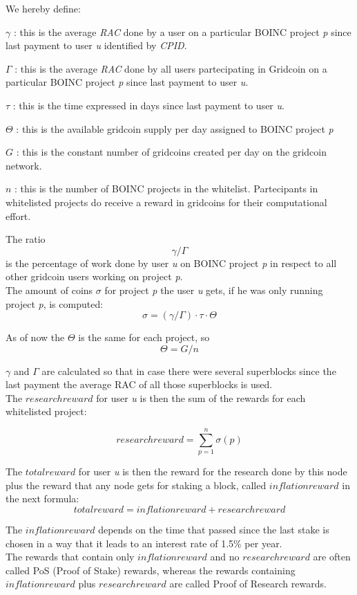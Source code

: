  

We hereby define:
\begin{description}
  \item{$\gamma$} : this is the average \textit{RAC} done by a user on a particular BOINC project \textit{p} since last payment to user \textit{u} identified by \textit{CPID}.
  \item{$\Gamma$} : this is the average \textit{RAC} done by all users partecipating in Gridcoin on a particular BOINC project \textit{p} since last payment to user \textit{u}.
  \item{$\tau$} : this is the time expressed in days since last payment to user \textit{u}.
  \item{$\Theta$} : this is the available gridcoin supply per day assigned to BOINC project \textit{p}
  \item{$G$} : this is the constant number of gridcoins created per day on the gridcoin network. 
  \item{$n$} : this is the number of BOINC projects in the whitelist. Partecipants in whitelisted projects do receive a reward in gridcoins for their computational effort.  
\end{description}

The ratio
\[\gamma/\Gamma\]
is the percentage of work done by user \textit{u} on BOINC project \textit{p} in respect to all other gridcoin users working on project \textit{p}.\\

The amount of coins $\sigma$ for project \textit{p} the user \textit{u} gets, if he was only running project \textit{p}, is computed:
\[ \sigma = (\gamma / \Gamma) \cdot \tau \cdot \Theta \]

As of now the $\Theta$ is the same for each project, so
\[ \Theta = G/n \]

$\gamma$ and $\Gamma$ are calculated so that in case there were several superblocks since the last payment the average RAC of all those superblocks is used.\\

The $researchreward$ for user \textit{u} is then the sum of the rewards for each whitelisted project:

\[ researchreward = \sum_{p=1}^{n} \sigma(p) \]


The $totalreward$  for user \textit{u} is then the reward for the research done by this node plus the reward that any node gets for staking a block, called $inflationreward$ in the next formula:
\[ totalreward = inflationreward +  researchreward \]

The $inflationreward$ depends on the time that passed since the last stake is chosen in a way that it leads to an interest rate of 1.5\% per year.\\

The rewards that contain only $inflationreward$ and no $researchreward$
are often called PoS (Proof of Stake) rewards, whereas the rewards containing $inflationreward$ plus $researchreward$ are called Proof of Research rewards.
